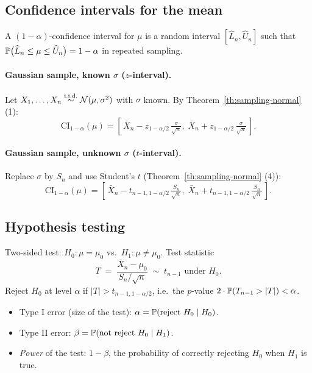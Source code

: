 \subsection{Confidence intervals for the mean}

\begin{defbox}
A $(1 - \alpha)$-confidence interval for $\mu$ is a random interval
$[\widehat{L}_n, \widehat{U}_n]$ such that
$\mathbb{P}\bigl(\widehat{L}_n \leq \mu \leq \widehat{U}_n\bigr) = 1 - \alpha$
in repeated sampling.
\end{defbox}

\paragraph{Gaussian sample, known $\sigma$ ($z$-interval).}
Let $X_1, \dots, X_n \overset{\text{i.i.d.}}{\sim} \mathcal{N}(\mu, \sigma^2)$ with $\sigma$
known. By Theorem~\ref{th:sampling-normal} (1):
\[
  \mathrm{CI}_{1-\alpha}(\mu)
  = \left[\,\bar{X}_n - z_{1-\alpha/2}\,\tfrac{\sigma}{\sqrt{n}},\;
            \bar{X}_n + z_{1-\alpha/2}\,\tfrac{\sigma}{\sqrt{n}}\,\right].
\]

\paragraph{Gaussian sample, unknown $\sigma$ ($t$-interval).}
Replace $\sigma$ by $S_n$ and use Student's $t$ (Theorem~\ref{th:sampling-normal} (4)):
\[
  \mathrm{CI}_{1-\alpha}(\mu)
  = \left[\,\bar{X}_n - t_{n-1, 1-\alpha/2}\,\tfrac{S_n}{\sqrt{n}},\;
            \bar{X}_n + t_{n-1, 1-\alpha/2}\,\tfrac{S_n}{\sqrt{n}}\,\right].
\]

\subsection{Hypothesis testing}

\begin{defbox}
Two-sided test:
$H_0: \mu = \mu_0$ vs.\ $H_1: \mu \neq \mu_0$. Test statistic
\[
  T \;=\; \frac{\bar{X}_n - \mu_0}{S_n / \sqrt{n}}
  \;\sim\; t_{n-1} \text{ under } H_0.
\]
Reject $H_0$ at level $\alpha$ if $|T| > t_{n-1, 1-\alpha/2}$, i.e.\ the
$p$-value $2 \cdot \mathbb{P}(T_{n-1} > |T|) < \alpha$.
\end{defbox}

\begin{rembox}[Errors]
\begin{itemize}
  \item Type I error (size of the test): $\alpha = \mathbb{P}(\text{reject } H_0 \mid H_0)$.
  \item Type II error: $\beta = \mathbb{P}(\text{not reject } H_0 \mid H_1)$.
  \item \emph{Power} of the test: $1 - \beta$, the probability of
        correctly rejecting $H_0$ when $H_1$ is true.
\end{itemize}
\end{rembox}

